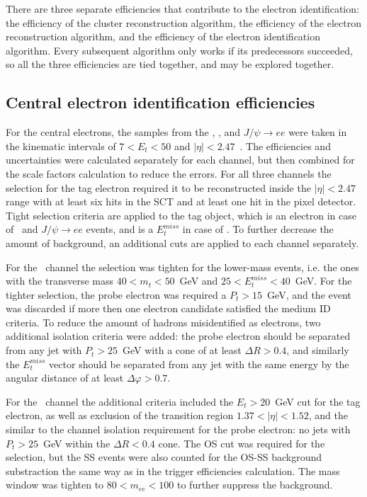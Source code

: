 There are three separate efficiencies that contribute to the electron identification: the efficiency of the cluster reconstruction algorithm, the efficiency of the electron reconstruction algorithm, and the efficiency of the electron identification algorithm. Every subsequent algorithm only works if its predecessors succeeded, so all the three efficiencies are tied together, and may be explored together.

\subsection{Central electron identification efficiencies}

For the central electrons, the samples from the \Zee, \Wenu, and $J/\psi \to ee$ were taken in the kinematic intervals of $7 < E_{t} < 50$ and $|\eta| < 2.47$~\cite{lib:elec_reco}. The efficiencies and uncertainties were calculated separately for each channel, but then combined for the scale factors calculation to reduce the errors. For all three channels the selection for the tag electron required it to be reconstructed inside the $|\eta| < 2.47$ range with at least six hits in the SCT and at least one hit in the pixel detector. Tight selection criteria are applied to the tag object, which is an electron in case of \Zee\ and $J/\psi \to ee$ events, and is a $E_{t}^{miss}$ in case of \Wenu. To further decrease the amount of background, an additional cuts are applied to each channel separately.

For the \Wenu\ channel the selection was tighten for the lower-mass events, i.e. the ones with the transverse mass $40 < m_{t} < 50$~GeV and $25 < E_{t}^{miss} < 40$~GeV. For the tighter selection, the probe electron was required a $P_{t} > 15$~GeV, and the event was discarded if more then one electron candidate satisfied the medium ID criteria. To reduce the amount of hadrons misidentified as electrons, two additional isolation criteria were added: the probe electron should be separated from any jet with $P_{t} > 25$~GeV with a cone of at least $\Delta R > 0.4$, and similarly the $E_{t}^{miss}$ vector should be separated from any jet with the same energy by the angular distance of at least $\Delta \varphi > 0.7$.

For the \Zee\ channel the additional criteria included the $E_{t} > 20$~GeV cut for the tag electron, as well as exclusion of the transition region $1.37 < |\eta| < 1.52$, and the similar to the \Wenu channel isolation requirement for the probe electron: no jets with $P_{t} > 25$~GeV within the $\Delta R < 0.4$ cone. The OS cut was required for the selection, but the SS events were also counted for the OS-SS background substraction the same way as in the trigger efficiencies calculation. The mass window was tighten to $80 < m_{ee} < 100$ to further suppress the background.


